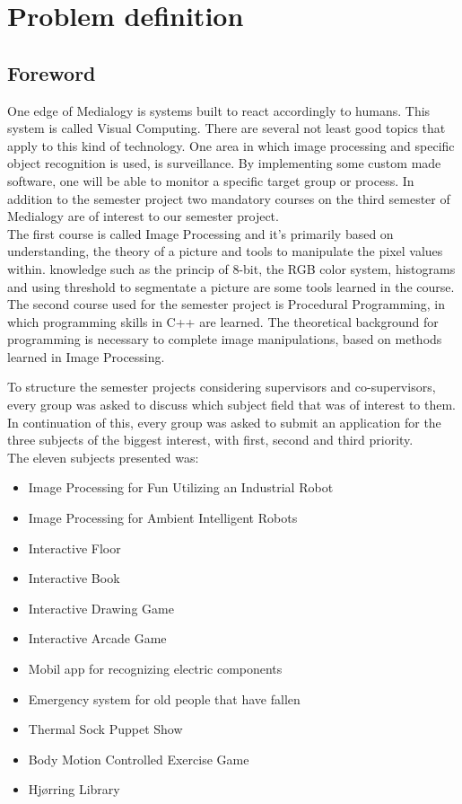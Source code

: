 \chapter{Problem definition}
\section{Foreword}
One edge of Medialogy is systems built to react accordingly to humans. This system is called Visual Computing. There are several not least good topics that apply to this kind of technology. One area in which image processing and specific object recognition is used, is surveillance. By implementing some custom made software, one will be able to monitor a specific target group or process. In addition to the semester project two mandatory courses on the third semester of Medialogy are of interest to our semester project.\\
The first course is called Image Processing and it's primarily based on understanding, the theory of a picture and tools to manipulate the pixel values within. knowledge such as the princip of 8-bit, the RGB color system, histograms and using threshold to segmentate a picture are some tools learned in the course.\\
The second course used for the semester project is Procedural Programming, in which programming skills in C++ are learned. The theoretical background for programming is necessary to complete image manipulations, based on methods learned in Image Processing.

To structure the semester projects considering supervisors and co-supervisors, every group was asked to discuss which subject field that was of interest to them. In continuation of this, every group was asked to submit an application for the three subjects of the biggest interest, with first, second and third priority.\\
The eleven subjects presented was:

\begin{itemize}
\item Image Processing for Fun Utilizing an Industrial Robot
\item Image Processing for Ambient Intelligent Robots
\item Interactive Floor
\item Interactive Book
\item Interactive Drawing Game
\item Interactive Arcade Game
\item Mobil app for recognizing electric components
\item Emergency system for old people that have fallen
\item Thermal Sock Puppet Show
\item Body Motion Controlled Exercise Game
\item Hjørring Library
\end{itemize}

